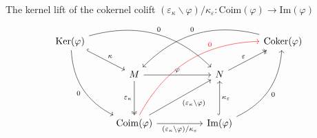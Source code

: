 The kernel lift of the cokernel colift
$(\varepsilon_{\kappa}\backslash\varphi)/\kappa_{\varepsilon} : \mathrm{Coim}(\varphi) \rightarrow \mathrm{Im}(\varphi)$
\[
\begin{tikzcd}
\mathrm{Ker}(\varphi) \arrow[rd, "\kappa", hook] \arrow[rddd, "0"', bend right] \arrow[rrrd, "0", bend left] &                                                                                                                                                                                              &  &                                                                                               & \mathrm{Coker}(\varphi) \arrow[llld, "0"', bend right] \\
                                                                                                             & M \arrow[rr, "\varphi"] \arrow[dd, "\varepsilon_{\kappa}"', two heads]                                                                                                                       &  & N \arrow[ru, "\varepsilon", two heads]                                                        &                                                        \\
                                                                                                             &                                                                                                                                                                                              &  &                                                                                               &                                                        \\
                                                                                                             & \mathrm{Coim}(\varphi) \arrow[rruu, "(\varepsilon_{\kappa}\backslash \varphi)"'] \arrow[rr, "(\varepsilon_{\kappa}\backslash\varphi)/\kappa_{\varepsilon}"'] \arrow[rrruuu, "0", pos=.7, color=red, bend left] &  & \mathrm{Im}(\varphi) \arrow[uu, "\kappa_{\varepsilon}"', hook] \arrow[ruuu, "0"', bend right] &                                                       
\end{tikzcd}
\]

